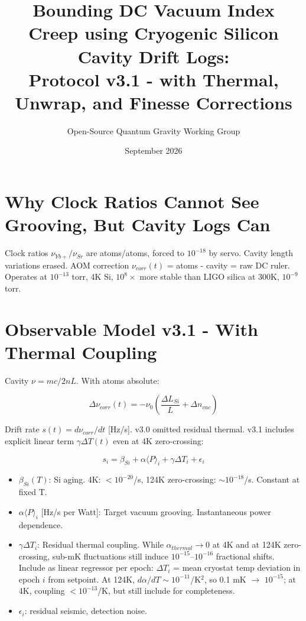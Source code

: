 \documentclass[11pt,a4paper]{article}
\title{Bounding DC Vacuum Index Creep using Cryogenic Silicon Cavity Drift Logs:\\ Protocol v3.1 - with Thermal, Unwrap, and Finesse Corrections}
\author{Open-Source Quantum Gravity Working Group}
\date{September 2026}
\begin{document}
\maketitle

\section{Why Clock Ratios Cannot See Grooving, But Cavity Logs Can}
Clock ratios $\nu_{Yb+}/\nu_{Sr}$ are atoms/atoms, forced to $10^{-18}$ by servo. Cavity length variations erased. AOM correction $\nu_{corr}(t)$ = atoms - cavity = raw DC ruler. Operates at $10^{-13}$ torr, 4K Si, $10^8\times$ more stable than LIGO silica at 300K, $10^{-9}$ torr.

\section{Observable Model v3.1 - With Thermal Coupling}

Cavity $\nu = m c / 2 n L$. With atoms absolute:

\begin{equation}
\Delta \nu_{corr}(t) = -\nu_0 \left( \frac{\Delta L_{Si}}{L} + \Delta n_{vac} \right)
\end{equation}

Drift rate $s(t)=d\nu_{corr}/dt$ [Hz/s]. v3.0 omitted residual thermal. v3.1 includes explicit linear term $\gamma \Delta T(t)$ even at 4K zero-crossing:

\begin{equation}
s_i = \beta_{Si} + \alpha \langle P \rangle_i + \gamma \Delta T_i + \epsilon_i \tag{1}
\end{equation}

\begin{itemize}
\item $\beta_{Si}(T)$: Si aging. 4K: $<10^{-20}$/s, 124K zero-crossing: $\sim10^{-18}$/s. Constant at fixed T.
\item $\alpha \langle P\rangle_i$ [Hz/s per Watt]: Target vacuum grooving. Instantaneous power dependence.
\item $\gamma \Delta T_i$: Residual thermal coupling. While $\alpha_{thermal}\rightarrow0$ at 4K and at 124K zero-crossing, sub-mK fluctuations still induce $10^{-15}$--$10^{-16}$ fractional shifts. Include as linear regressor per epoch: $\Delta T_i$ = mean cryostat temp deviation in epoch $i$ from setpoint. At 124K, $d\alpha/dT \sim 10^{-11}$/K$^2$, so 0.1 mK $\rightarrow$ $10^{-15}$; at 4K, coupling $<10^{-13}$/K, but still include for completeness.
\item $\epsilon_i$: residual seismic, detection noise.
\end{itemize}
\end{document}
